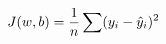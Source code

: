 \documentclass[preview]{standalone}
\begin{document}
\begin{align*}
\special{dvisvgm:raw <g id='unique000'>}J(w, b) = \frac{1}{n} \sum (y_i - \hat{y}_i)^2\special{dvisvgm:raw </g>}
\end{align*}
\end{document}
